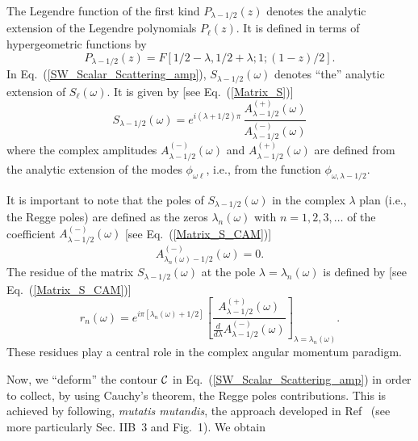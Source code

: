 \documentclass[aps,prd,longbibliography,reprint,twocolumn,amsmath,amssymb,amsfonts,showpacs,superscriptaddress]{revtex4-1}%
\begin{document}
The Legendre function of the first kind $P_{\lambda -1/2} (z)$ denotes the analytic extension of the Legendre polynomials $P_\ell (z)$. It is defined in terms of hypergeometric functions by \cite{AS65}
\begin{equation}\label{Def_ext_LegendreP}
P_{\lambda -1/2} (z) = F[1/2-\lambda,1/2+\lambda;1;(1-z)/2].
\end{equation}
In Eq.~(\ref{SW_Scalar_Scattering_amp}), $S_{\lambda -1/2} (\omega)$ denotes ``the'' analytic extension of $S_\ell (\omega)$. It is given by [see Eq.~(\ref{Matrix_S})]
\begin{equation}\label{Matrix_S_CAM}
  S_{\lambda -1/2}(\omega) =  e^{i(\lambda + 1/2)\pi} \, \frac{A_{\lambda -1/2}^{(+)}(\omega)}{A_{\lambda -1/2}^{(-)}(\omega)}
\end{equation}
where the complex amplitudes $A^{(-)}_{\lambda -1/2} (\omega)$ and  $A^{(+)}_{\lambda -1/2} (\omega)$ are defined from the analytic extension of the modes $\phi_{\omega \ell}$, i.e., from the function $\phi_{\omega ,\lambda -1/2}$.

It is important to note that the poles of  $S_{\lambda -1/2} (\omega)$ in the complex $\lambda$ plan (i.e., the Regge poles) are defined  as  the zeros $\lambda_n(\omega)$ with $n=1,2,3,\ldots$ of the coefficient  $A^{(-)}_{\lambda-1/2} (\omega)$ [see Eq.~(\ref{Matrix_S_CAM})]
\begin{equation}\label{PR_def_Am}
A^{(-)}_{\lambda_n(\omega)-1/2} (\omega)=0.
\end{equation}
The residue of the matrix $S_{\lambda-1/2}(\omega)$ at the pole $\lambda=\lambda_n(\omega)$ is defined by [see Eq.~(\ref{Matrix_S_CAM})]
\begin{equation}\label{residues_RP}
r_n(\omega)=e^{i\pi [\lambda_n(\omega)+1/2]} \left[ \frac{A_{\lambda -1/2}^{(+)}(\omega)}{\frac{d}{d \lambda}A_{\lambda -1/2}^{(-)}(\omega)}\right]_{\lambda=\lambda_n(\omega)}.
\end{equation}
These residues play a central role in the complex angular momentum paradigm.


Now, we ``deform'' the contour ${\cal C}$ in Eq.~(\ref{SW_Scalar_Scattering_amp}) in order to collect, by using Cauchy's theorem, the Regge poles contributions. This is achieved by following, \textit{mutatis mutandis}, the approach developed in Ref~\cite{Folacci:2019cmc} (see more particularly Sec. IIB~3 and Fig.~1). We obtain
\end{document}
